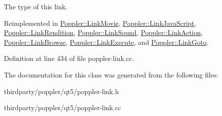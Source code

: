 The type of this link. 

Reimplemented in \hyperlink{class_poppler_1_1_link_movie_a01b861d592530f64d3b35a2618ba21e6}{Poppler\+::\+Link\+Movie}, \hyperlink{class_poppler_1_1_link_java_script_a4fda2a64f798cdec7fffc0a8061c4cd1}{Poppler\+::\+Link\+Java\+Script}, \hyperlink{class_poppler_1_1_link_rendition_a4b43aec3a2a271aa40579e3f702ab91e}{Poppler\+::\+Link\+Rendition}, \hyperlink{class_poppler_1_1_link_sound_a832bdadf229fb2379143d001e15a4697}{Poppler\+::\+Link\+Sound}, \hyperlink{class_poppler_1_1_link_action_a20ec1a625cb94bb9a44f5399c6a5b9fd}{Poppler\+::\+Link\+Action}, \hyperlink{class_poppler_1_1_link_browse_a9743123e724e1a4076083cff8b290a31}{Poppler\+::\+Link\+Browse}, \hyperlink{class_poppler_1_1_link_execute_a77c65404c0d2e96604f4db64f7a09605}{Poppler\+::\+Link\+Execute}, and \hyperlink{class_poppler_1_1_link_goto_a4060fbbbe4ebcb4bd55e737659b55092}{Poppler\+::\+Link\+Goto}.



Definition at line 434 of file poppler-\/link.\+cc.



The documentation for this class was generated from the following files\+:\begin{DoxyCompactItemize}
\item 
thirdparty/poppler/qt5/poppler-\/link.\+h\item 
thirdparty/poppler/qt5/poppler-\/link.\+cc\end{DoxyCompactItemize}
